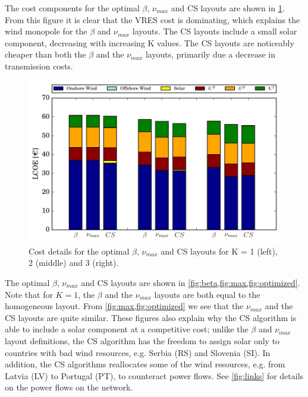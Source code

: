 \documentclass[a4paper, 12pt, sort&compress]{elsarticle}%
\begin{document}
The cost components for the optimal $\beta$, $\nu_{max}$ and CS layouts are
shown in \cref{fig:cost}. From this figure it is clear that the VRES
cost is dominating, which explains the wind monopole for the $\beta$ and
$\nu_{max}$ layouts. The CS layouts include a small solar component,
decreasing with increasing K values. The CS layouts are noticeably
cheaper than both the $\beta$ and the $\nu_{max}$ layouts, primarily due a
decrease in transmission costs.

\begin{figure}[h!]
  \centering
  \includegraphics[width = \columnwidth]{costVE50}
  \caption{Cost details for the optimal $\beta$, $\nu_{max}$ and CS layouts
    for K = 1 (left), 2 (middle) and 3 (right).}
  \label{fig:cost}
\end{figure}

The optimal $\beta$, $\nu_{max}$ and CS layouts are shown in
\cref{fig:beta,fig:max,fig:optimized}. Note that for $K=1$, the
$\beta$ and the $\nu_{max}$ layouts are both equal to the homogeneous
layout.  From \cref{fig:max,fig:optimized} we see that the $\nu_{max}$
and the CS layouts are quite similar. These figures also explain why
the CS algorithm is able to include a solar component at a competitive
cost; unlike the $\beta$ and $\nu_{max}$ layout definitions, the CS algorithm
has the freedom to assign solar only to countries with bad wind
resources, e.g. Serbia (RS) and Slovenia (SI). In addition, the CS
algorithms reallocates some of the wind resources, e.g. from Latvia
(LV) to Portugal (PT), to counteract power flows. See \cref{fig:links}
for details on the power flows on the network.

\end{document}
